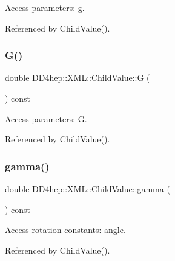 Access parameters\+: g. 



Referenced by Child\+Value().

\hypertarget{struct_d_d4hep_1_1_x_m_l_1_1_child_value_ab7e59af1efa7a4a8fe98e241e19a223c}{}\label{struct_d_d4hep_1_1_x_m_l_1_1_child_value_ab7e59af1efa7a4a8fe98e241e19a223c} 
\subsubsection{\texorpdfstring{G()}{G()}}
{\footnotesize\ttfamily double D\+D4hep\+::\+X\+M\+L\+::\+Child\+Value\+::G (\begin{DoxyParamCaption}{ }\end{DoxyParamCaption}) const}



Access parameters\+: G. 



Referenced by Child\+Value().

\hypertarget{struct_d_d4hep_1_1_x_m_l_1_1_child_value_a8346008b0e9d28425b02ea0d1fd40500}{}\label{struct_d_d4hep_1_1_x_m_l_1_1_child_value_a8346008b0e9d28425b02ea0d1fd40500} 
\subsubsection{\texorpdfstring{gamma()}{gamma()}}
{\footnotesize\ttfamily double D\+D4hep\+::\+X\+M\+L\+::\+Child\+Value\+::gamma (\begin{DoxyParamCaption}{ }\end{DoxyParamCaption}) const}



Access rotation constants\+: angle. 



Referenced by Child\+Value().

\hypertarget{struct_d_d4hep_1_1_x_m_l_1_1_child_value_a60a898fb4a04d474883c0d82561e40f2}{}\label{struct_d_d4hep_1_1_x_m_l_1_1_child_value_a60a898fb4a04d474883c0d82561e40f2} 
